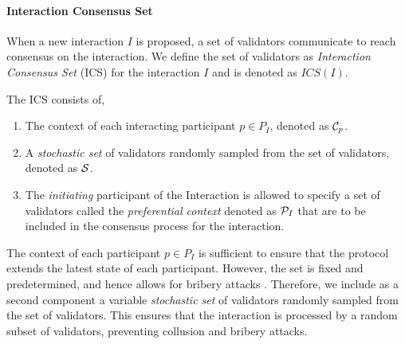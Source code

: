 

\paragraph{\textbf{Interaction Consensus Set}}
When a new interaction $I$ is proposed, a set of validators communicate to reach consensus on the interaction. We define the set of validators as \emph{Interaction Consensus Set} (ICS) for the interaction $I$ and is denoted as $\mathit{ICS}(I)$.

The ICS consists of,
\begin{enumerate}
    \item The context of each interacting participant $p\in P_I$, denoted as $\mathcal{C}_p$.
    \item A \emph{stochastic set} of validators randomly sampled from the set of validators, denoted as $\mathcal{S}$.
    \item The \emph{initiating} participant of the Interaction is allowed to specify a set of validators called the \emph{preferential context} denoted as $\mathcal{P}_I$ that are to be included in the consensus process for the interaction.
\end{enumerate}

The context of each participant $p \in P_I$ is sufficient to ensure that the protocol extends the latest state of each participant. However, the set is fixed and predetermined, and hence allows for bribery attacks \cite{KKZ24}. Therefore, we include as a second component a variable \emph{stochastic set} of validators randomly sampled from the set of validators. This ensures that the interaction is processed by a random subset of validators, preventing collusion and bribery attacks. 


